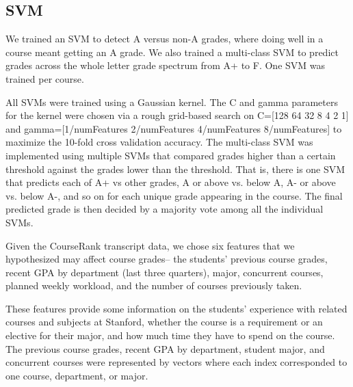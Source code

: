 \subsection{SVM}
We trained an SVM to detect A versus non-A grades, where doing well in a course meant getting an A grade.  We also trained a multi-class SVM to predict grades across the whole letter grade spectrum from A+ to F. One SVM was trained per course.

All SVMs were  trained using a Gaussian kernel. The C and gamma parameters for the kernel were chosen via a rough grid-based search on C=[128 64 32 8 4 2 1] and gamma=[1/numFeatures 2/numFeatures 4/numFeatures 8/numFeatures] to maximize the 10-fold cross validation accuracy. The multi-class SVM was implemented using multiple SVMs that compared grades higher than a certain threshold against the grades lower than the threshold. That is, there is one SVM that predicts each of  A+ vs other grades, A or above vs. below A, A- or above vs. below A-, and so on for each unique grade appearing in the course. The final predicted grade is then decided by a majority vote among all the individual SVMs.


Given the CourseRank transcript data, we chose six features that we hypothesized may affect course grades-- the students' previous course grades, recent GPA by department (last three quarters), major, concurrent courses, planned weekly workload, and the number of courses previously taken.

These features provide some information on the students' experience with related courses and subjects at Stanford, whether the course is a requirement or an elective for their major, and how much time they have to spend on the course. The previous course grades, recent GPA by department, student major, and concurrent courses were represented by vectors where each index corresponded to one course, department, or major.




